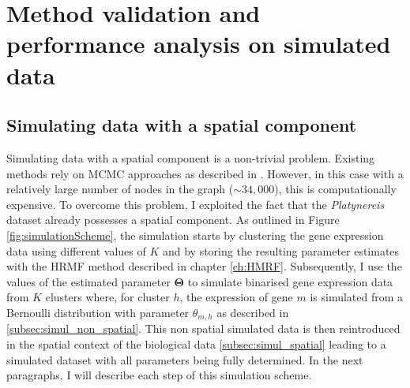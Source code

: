 \chapter{Method validation and performance analysis on simulated data}\label{ch:simulations} 
\section{Simulating data with a spatial component }
Simulating data with a spatial component is a non-trivial problem. Existing methods rely on MCMC approaches as described in \cite{Chalmond89}. However, in this case with a relatively large number of nodes in the graph ($\sim 34,000$), this is computationally expensive. To overcome this problem, I exploited the fact that the {\it{Platynereis}} dataset already possesses a spatial component. As outlined in Figure \ref{fig:simulationScheme}, the simulation starts by clustering the gene expression data using different values of $K$ and by storing the resulting parameter estimates with the HRMF method described in chapter \ref{ch:HMRF}. Subsequently, I use the values of the estimated parameter $\boldsymbol{\Theta}$ to simulate binarised gene expression data from $K$ clusters where, for cluster $h$, the expression of gene $m$ is simulated from a Bernoulli distribution with parameter $\theta_{m,h}$ as described in \ref{subsec:simul_non_spatial}. This non spatial simulated data is then reintroduced in the spatial context of the biological data \ref{subsec:simul_spatial} leading to a simulated dataset with all parameters being fully determined. In the next paragraphs, I will describe each step of this simulation scheme.

